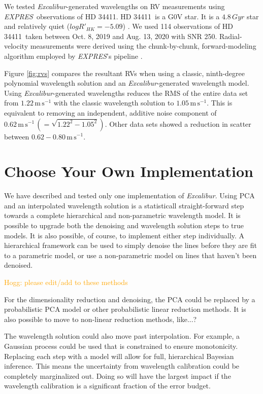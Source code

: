 \documentclass[modern]{aastex63}
\newcommand{\project}[1]{\textsl{#1}}
\newcommand{\name}{\project{Excalibur}}
\newcommand{\acronym}[1]{{\small{#1}}}
\newcommand{\expres}{\project{\acronym{EXPRES}}}
\newcommand{\target}{HD 34411}
\newcommand{\lz}[1]{\textcolor{orange}{#1}}
\newcommand{\mps}{\mathrm{m\,s^{-1}}}
\begin{document}
We tested \name -generated wavelengths on RV measurements using \expres\ observations of \target.  \target\ is a G0V star.  It is a $4.8\, Gyr$ star and relatively quiet ($log R'_{HK} = -5.09$) \citep{brewer2016}.  We used 114 observations of \target\ taken between Oct. 8, 2019 and Aug. 13, 2020 with SNR 250.  Radial-velocity measurements were derived using the chunk-by-chunk, forward-modeling algorithm employed by \expres's pipeline \citep{petersburg2020}.

Figure \ref{fig:rvs} compares the resultant RVs when using a classic, ninth-degree polynomial wavelength solution and an \name -generated wavelength model.  Using \name -generated wavelengths reduces the RMS of the entire data set from $1.22\, \mps$ with the classic wavelength solution to $1.05\, \mps$.  This is equivalent to removing an independent, additive noise component of $0.62\, \mps \,(=\sqrt{1.22^2-1.05^2})$.  Other data sets showed a reduction in scatter between $0.62-0.80\, \mps$.


\section{Choose Your Own Implementation} \label{sec:choices}
We have described and tested only one implementation of \name.  Using PCA and an interpolated wavelength solution is a statisticall straight-forward step towards a complete hierarchical and non-parametric wavelength model.  It is possible to upgrade both the denoising and wavelength solution steps to true models.  It is also possible, of course, to implement either step individually.  A hierarchical framework can be used to simply denoise the lines before they are fit to a parametric model, or use a non-parametric model on lines that haven't been denoised.

\lz{Hogg: please edit/add to these methods}

For the dimensionality reduction and denoising, the PCA could be replaced by a probabilistic PCA model or other probabilistic linear reduction methods.  It is also possible to move to non-linear reduction methods, like...?

The wavelength solution could also move past interpolation.  For example, a Gaussian process could be used that is constrained to ensure monotonicity.  Replacing each step with a model will allow for full, hierarchical Bayesian inference.  This means the uncertainty from wavelength calibration could be completely marginalized out.  Doing so will have the largest impact if the wavelength calibration is a significant fraction of the error budget.
\end{document}
